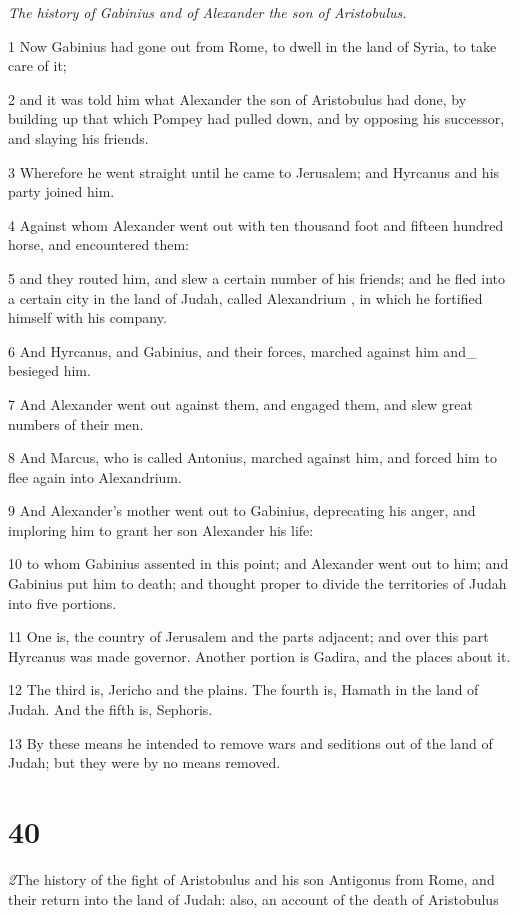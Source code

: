 \par \textit{The history of Gabinius and of Alexander the son of Aristobulus.}

1 Now Gabinius had gone out from Rome, to dwell in the land of Syria, to take care of it; 

2 and it was told him what Alexander the son of Aristobulus had done, by building up that which Pompey had pulled down, and by opposing his successor, and slaying his friends. 

3 Wherefore he went straight until he came to Jerusalem; and Hyrcanus and his party joined him. 

4 Against whom Alexander went out with ten thousand foot and fifteen hundred horse, and encountered them: 

5 and they routed him, and slew a certain number of his friends; and he fled into a certain city in the land of Judah, called Alexandrium , in which he fortified himself with his company. 

6 And Hyrcanus, and Gabinius, and their forces, marched against him and_ besieged him. 

7 And Alexander went out against them, and engaged them, and slew great numbers of their men. 

8 And Marcus, who is called Antonius, marched against him, and forced him to flee again into Alexandrium.

9 And Alexander’s mother went out to Gabinius, deprecating his anger, and imploring him to grant her son Alexander his life: 

10 to whom Gabinius assented in this point; and Alexander went out to him; and Gabinius put him to death; and thought proper to divide the territories of Judah into five portions. 

11 One is, the country of Jerusalem and the parts adjacent; and over this part Hyrcanus was made governor. Another portion is Gadira, and the places about it. 

12 The third is, Jericho and the plains. The fourth is, Hamath in the land of Judah. And the fifth is, Sephoris. 

13 By these means he intended to remove wars and seditions out of the land of Judah; but they were by no means removed. 

\chapter{40}

\par \textit2{The history of the fight of Aristobulus and his son Antigonus from Rome, and their return into the land of Judah: also, an account of the death of Aristobulus}


